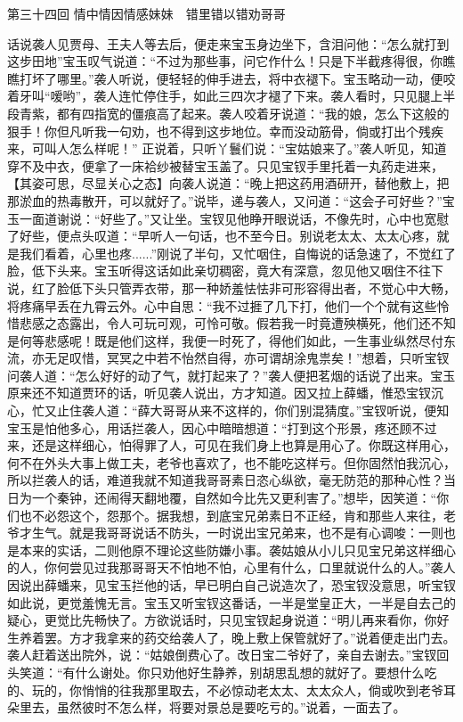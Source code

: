 \documentclass[12pt,oneside]{book}
\begin{document}
 
第三十四回  情中情因情感妹妹　错里错以错劝哥哥


话说袭人见贾母、王夫人等去后，便走来宝玉身边坐下，含泪问他：“怎么就打到这步田地”宝玉叹气说道：“不过为那些事，问它作什么！只是下半截疼得很，你瞧瞧打坏了哪里。”袭人听说，便轻轻的伸手进去，将中衣褪下。宝玉略动一动，便咬着牙叫“嗳哟”，袭人连忙停住手，如此三四次才褪了下来。袭人看时，只见腿上半段青紫，都有四指宽的僵痕高了起来。袭人咬着牙说道：“我的娘，怎么下这般的狠手！你但凡听我一句劝，也不得到这步地位。幸而没动筋骨，倘或打出个残疾来，可叫人怎么样呢！”
正说着，只听丫鬟们说：“宝姑娘来了。”袭人听见，知道穿不及中衣，便拿了一床袷纱被替宝玉盖了。只见宝钗手里托着一丸药走进来，【其姿可思，尽显关心之态】向袭人说道：“晚上把这药用酒研开，替他敷上，把那淤血的热毒散开，可以就好了。”说毕，递与袭人，又问道：“这会子可好些？”宝玉一面道谢说：“好些了。”又让坐。宝钗见他睁开眼说话，不像先时，心中也宽慰了好些，便点头叹道：“早听人一句话，也不至今日。别说老太太、太太心疼，就是我们看着，心里也疼......”刚说了半句，又忙咽住，自悔说的话急速了，不觉红了脸，低下头来。宝玉听得这话如此亲切稠密，竟大有深意，忽见他又咽住不往下说，红了脸低下头只管弄衣带，那一种娇羞怯怯非可形容得出者，不觉心中大畅，将疼痛早丢在九霄云外。心中自思：“我不过捱了几下打，他们一个个就有这些怜惜悲感之态露出，令人可玩可观，可怜可敬。假若我一时竟遭殃横死，他们还不知是何等悲感呢！既是他们这样，我便一时死了，得他们如此，一生事业纵然尽付东流，亦无足叹惜，冥冥之中若不怡然自得，亦可谓胡涂鬼祟矣！”想着，只听宝钗问袭人道：“怎么好好的动了气，就打起来了？”袭人便把茗烟的话说了出来。宝玉原来还不知道贾环的话，听见袭人说出，方才知道。因又拉上薛蟠，惟恐宝钗沉心，忙又止住袭人道：“薛大哥哥从来不这样的，你们别混猜度。”宝钗听说，便知宝玉是怕他多心，用话拦袭人，因心中暗暗想道：“打到这个形景，疼还顾不过来，还是这样细心，怕得罪了人，可见在我们身上也算是用心了。你既这样用心，何不在外头大事上做工夫，老爷也喜欢了，也不能吃这样亏。但你固然怕我沉心，所以拦袭人的话，难道我就不知道我哥哥素日恣心纵欲，毫无防范的那种心性？当日为一个秦钟，还闹得天翻地覆，自然如今比先又更利害了。”想毕，因笑道：“你们也不必怨这个，怨那个。据我想，到底宝兄弟素日不正经，肯和那些人来往，老爷才生气。就是我哥哥说话不防头，一时说出宝兄弟来，也不是有心调唆：一则也是本来的实话，二则他原不理论这些防嫌小事。袭姑娘从小儿只见宝兄弟这样细心的人，你何尝见过我那哥哥天不怕地不怕，心里有什么，口里就说什么的人。”袭人因说出薛蟠来，见宝玉拦他的话，早已明白自己说造次了，恐宝钗没意思，听宝钗如此说，更觉羞愧无言。宝玉又听宝钗这番话，一半是堂皇正大，一半是自去己的疑心，更觉比先畅快了。方欲说话时，只见宝钗起身说道：“明儿再来看你，你好生养着罢。方才我拿来的药交给袭人了，晚上敷上保管就好了。”说着便走出门去。袭人赶着送出院外，说：“姑娘倒费心了。改日宝二爷好了，亲自去谢去。”宝钗回头笑道：“有什么谢处。你只劝他好生静养，别胡思乱想的就好了。要想什么吃的、玩的，你悄悄的往我那里取去，不必惊动老太太、太太众人，倘或吹到老爷耳朵里去，虽然彼时不怎么样，将要对景总是要吃亏的。”说着，一面去了。
\end{document}
